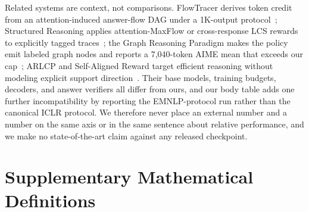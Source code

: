 Related systems are context, not comparisons. FlowTracer derives token credit from an attention-induced answer-flow DAG under a 1K-output protocol~\citep{dong2026flowtracer}; Structured Reasoning applies attention-MaxFlow or cross-response LCS rewards to explicitly tagged traces~\citep{dong2026structured}; the Graph Reasoning Paradigm makes the policy emit labeled graph nodes and reports a 7,040-token AIME mean that exceeds our cap~\citep{liu2026graph}; ARLCP and Self-Aligned Reward target efficient reasoning without modeling explicit support direction~\citep{yu2026arlcp,han2026sar}. Their base models, training budgets, decoders, and answer verifiers all differ from ours, and our body table adds one further incompatibility by reporting the EMNLP-protocol run rather than the canonical ICLR protocol. We therefore never place an external number and a \method{} number on the same axis or in the same sentence about relative performance, and we make no state-of-the-art claim against any released checkpoint.

\section{Supplementary Mathematical Definitions}
\label{app:math_details}

